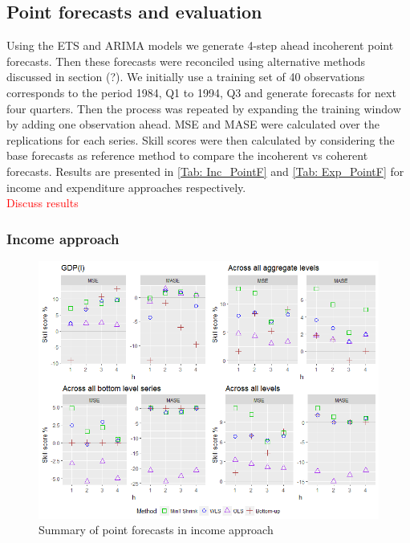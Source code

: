 \documentclass[graybox]{svmult}
\begin{document}
\subsection{Point forecasts and evaluation}

Using the ETS and ARIMA models we generate 4-step ahead incoherent point forecasts. Then these forecasts were reconciled using alternative methods discussed in section (?). We initially use a training set of 40 observations corresponds to the period 1984, Q1 to 1994, Q3 and generate forecasts for next four quarters. Then the process was repeated by expanding the training window by adding one observation ahead. MSE and MASE were calculated over the replications for each series. Skill scores were then calculated by considering the base forecasts as reference method to compare the incoherent vs coherent forecasts. Results are presented in \ref{Tab: Inc_PointF} and \ref{Tab: Exp_PointF} for income and expenditure approaches respectively. \\

\textcolor{red}{Discuss results}

\subsubsection*{Income approach}

\begin{figure}[H]
	\centering
	\small
	\includegraphics[scale=0.50]{Figs/Results/INC-PointF.png}
	\caption{Summary of point forecasts in income approach}\label{Exp-PointF}
\end{figure}
\end{document}
